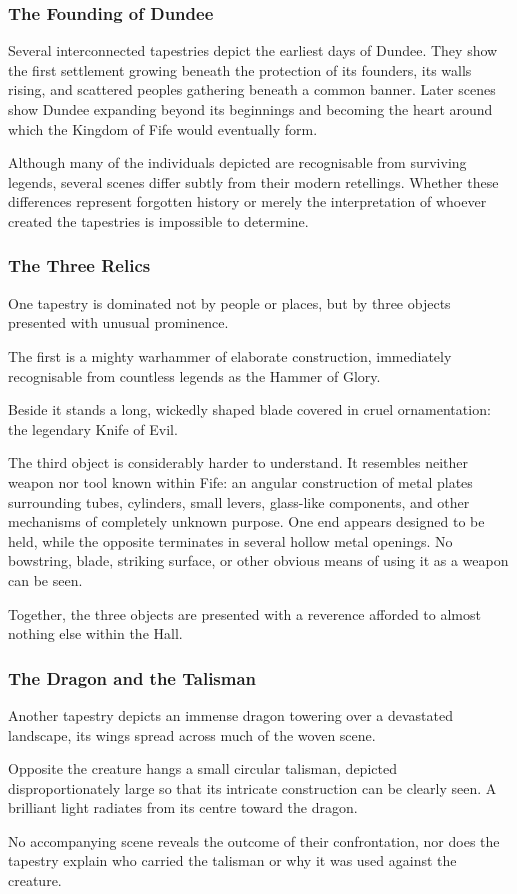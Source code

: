 \subsubsection*{The Founding of Dundee}
{\entryfont Several interconnected tapestries depict the earliest days of Dundee. They show the first settlement growing beneath the protection of its founders, its walls rising, and scattered peoples gathering beneath a common banner. Later scenes show Dundee expanding beyond its beginnings and becoming the heart around which the Kingdom of Fife would eventually form.

Although many of the individuals depicted are recognisable from surviving legends, several scenes differ subtly from their modern retellings. Whether these differences represent forgotten history or merely the interpretation of whoever created the tapestries is impossible to determine.}

\subsubsection*{The Three Relics}
{\entryfont One tapestry is dominated not by people or places, but by three objects presented with unusual prominence.

The first is a mighty warhammer of elaborate construction, immediately recognisable from countless legends as the Hammer of Glory.

Beside it stands a long, wickedly shaped blade covered in cruel ornamentation: the legendary Knife of Evil.

The third object is considerably harder to understand. It resembles neither weapon nor tool known within Fife: an angular construction of metal plates surrounding tubes, cylinders, small levers, glass-like components, and other mechanisms of completely unknown purpose. One end appears designed to be held, while the opposite terminates in several hollow metal openings. No bowstring, blade, striking surface, or other obvious means of using it as a weapon can be seen.

Together, the three objects are presented with a reverence afforded to almost nothing else within the Hall.}

\subsubsection*{The Dragon and the Talisman}
{\entryfont Another tapestry depicts an immense dragon towering over a devastated landscape, its wings spread across much of the woven scene.

Opposite the creature hangs a small circular talisman, depicted disproportionately large so that its intricate construction can be clearly seen. A brilliant light radiates from its centre toward the dragon.

No accompanying scene reveals the outcome of their confrontation, nor does the tapestry explain who carried the talisman or why it was used against the creature.}

